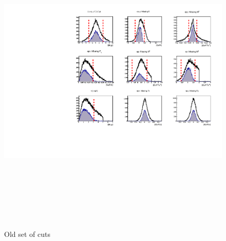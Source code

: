 
\section*{}

\begin{figure}[h!]
\includegraphics[height=15.0cm]{incoh/old_all_incoh_exc_cuts.pdf}
\caption{Old set of cuts}
\label{fig:cuts}
\end{figure}

